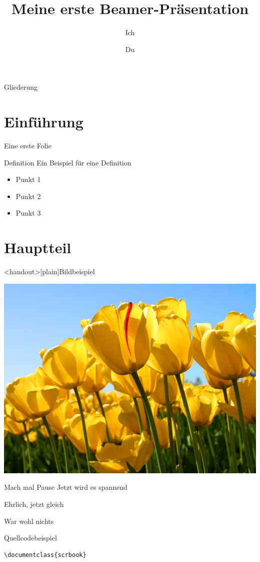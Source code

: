 \documentclass[]{beamer}
\begin{document}
\title{Meine erste Beamer-Präsentation}
\author{Ich \and Du}

\begin{frame}{}
    \titlepage
\end{frame}    

\begin{frame}{Gliederung}
    \tableofcontents
\end{frame}

\section{Einführung}    
\begin{frame}{Eine erste Folie}
\begin{block}{Definition}
Ein Beispiel für eine Definition
\end{block}
\pause
\begin{itemize}[<+-|alert@+>]
    \item Punkt 1
    \item Punkt 2
    \item Punkt 3
\end{itemize}
\end{frame}

\section{Hauptteil}
\begin{frame}<handout>[plain]{Bildbeispiel}
\begin{center}
    \includegraphics[width=\textwidth,height=0.8\textheight,keepaspectratio]{Tulips}
\end{center}
\end{frame}

\begin{frame}{Mach mal Pause}
Jetzt wird es spannend\pause

Ehrlich, jetzt gleich\pause

War wohl nichts
\end{frame}

\begin{frame}[fragile]{Quellcodebeispiel}
\begin{lstlisting}
\documentclass{scrbook}
\end{lstlisting}
\end{frame}
\end{document}
